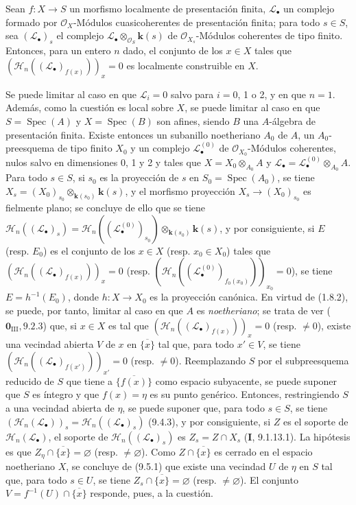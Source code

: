 \begin{proposition}[9.9.6]
\label{IV.9.9.6}
Sean $f:X\to S$ un morfismo localmente de presentación finita,
$\mathcal L_\bullet$ un complejo formado por $\mathcal O_X$-Módulos
cuasicoherentes de presentación finita; para todo $s\in S$, sea
$(\mathcal L_\bullet)_s$ el complejo
$\mathcal L_\bullet\otimes_{\mathcal O_S}\boldsymbol{k}(s)$ de
$\mathcal O_{X_s}$-Módulos coherentes de tipo finito. Entonces, para un entero $n$
dado, el conjunto de los $x\in X$ tales que
$(\mathcal H_n((\mathcal L_\bullet)_{f(x)}))_x=0$ es localmente construible
en $X$.
\end{proposition}

Se puede limitar al caso en que $\mathcal L_i=0$ salvo para $i=0$, 1 o 2, y en que
$n=1$. Además, como la cuestión es local sobre $X$, se puede limitar al caso en que
$S=\operatorname{Spec}(A)$ y $X=\operatorname{Spec}(B)$ son afines, siendo $B$
una $A$-álgebra de presentación finita. Existe entonces un subanillo
noetheriano $A_0$ de $A$, un $A_0$-preesquema de tipo finito $X_0$ y un complejo
$\mathcal L_\bullet^{(0)}$ de $\mathcal O_{X_0}$-Módulos coherentes, nulos salvo en
dimensiones 0, 1 y 2 y tales que
$X=X_0\otimes_{A_0}A$ y
$\mathcal L_\bullet=\mathcal L_\bullet^{(0)}\otimes_{A_0}A$. Para todo
$s\in S$, si $s_0$ es la proyección de $s$ en
$S_0=\operatorname{Spec}(A_0)$, se tiene
$X_s=(X_0)_{s_0}\otimes_{\mathbf{k}(s_0)}\boldsymbol{k}(s)$, y el morfismo proyección
$X_s\to(X_0)_{s_0}$ es fielmente plano; se concluye de ello que se tiene
$\mathcal H_n((\mathcal L_\bullet)_s)=
\mathcal H_n((\mathcal L_\bullet^{(0)})_{s_0})
\otimes_{\mathbf{k}(s_0)}\boldsymbol{k}(s)$,
y por consiguiente, si $E$ (resp. $E_0$) es el conjunto de los $x\in X$ (resp.
$x_0\in X_0$) tales que
$(\mathcal H_n((\mathcal L_\bullet)_{f(x)}))_x=0$
(resp.
$(\mathcal H_n((\mathcal L_\bullet^{(0)})_{f_0(x_0)}))_{x_0}=0$),
se tiene $E=h^{-1}(E_0)$, donde $h:X\to X_0$ es la proyección canónica. En virtud
de (1.8.2), se puede, por tanto, limitar al caso en que $A$ es \emph{noetheriano}; se
trata de ver ($\mathbf 0_{\mathrm{III}},9.2.3$) que, si $x\in X$ es tal que
$(\mathcal H_n((\mathcal L_\bullet)_{f(x)}))_x=0$ (resp. $\neq0$), existe una
vecindad abierta $V$ de $x$ en $\overline{\{x\}}$ tal que, para todo
$x'\in V$, se tiene
$(\mathcal H_n((\mathcal L_\bullet)_{f(x')}))_{x'}=0$ (resp. $\neq0$).
Reemplazando $S$ por el subpreesquema reducido de $S$ que tiene a
$\overline{\{f(x)\}}$ como espacio subyacente, se puede suponer que $S$ es
íntegro y que $f(x)=\eta$ es su punto genérico. Entonces, restringiendo $S$
a una vecindad abierta de $\eta$, se puede suponer que, para todo $s\in S$, se tiene
$(\mathcal H_n(\mathcal L_\bullet))_s=
\mathcal H_n((\mathcal L_\bullet)_s)$ (9.4.3), y por consiguiente, si $Z$ es el
soporte de $\mathcal H_n(\mathcal L_\bullet)$, el soporte de
$\mathcal H_n((\mathcal L_\bullet)_s)$ es $Z_s=Z\cap X_s$
(\textbf{I}, 9.1.13.1). La hipótesis es que
$Z_\eta\cap\overline{\{x\}}=\varnothing$ (resp. $\neq\varnothing$). Como
$Z\cap\overline{\{x\}}$ es cerrado en el espacio noetheriano $X$, se concluye de
(9.5.1) que existe una vecindad $U$ de $\eta$ en $S$ tal que, para todo
$s\in U$, se tiene $Z_s\cap\overline{\{x\}}=\varnothing$ (resp.
$\neq\varnothing$). El conjunto $V=f^{-1}(U)\cap\overline{\{x\}}$ responde, pues, a
la cuestión.

